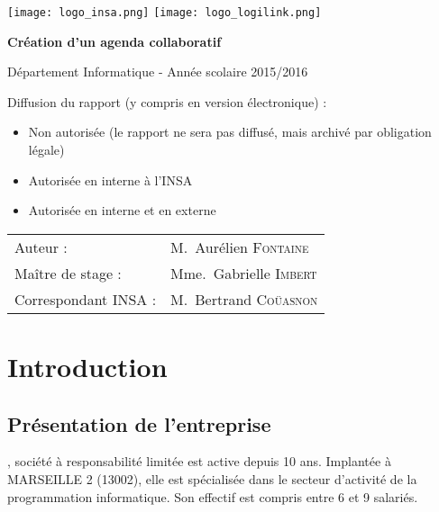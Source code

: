 \documentclass[a4paper, 11pt]{report}
\begin{document}
    \begin{titlepage}
        \texttt{[image: logo\_insa.png]}
        \hspace{0.35\textwidth}
        \texttt{[image: logo\_logilink.png]}
        \begin{center}
	        \vspace{7cm}
	        {\huge\bfseries Création d'un agenda collaboratif \par}
	        \vspace{0.5cm}
	        {\Large Département Informatique - Année scolaire 2015/2016\par}
        \end{center}
        \vfill

		Diffusion du rapport (y compris en version électronique) :

		\begin{itemize}
		\item Non autorisée (le rapport ne sera pas diffusé, mais archivé par obligation légale)
		\item Autorisée en interne à l’INSA
 		\item Autorisée en interne et en externe
 		\end{itemize}

		\vspace{0.5cm}

    	\begin{tabular}{ll}
	    	{\Large Auteur :}             & M.~Aurélien \textsc{Fontaine}\\
	        {\Large Maître de stage :}    & Mme.~Gabrielle \textsc{Imbert}\\
	        {\Large Correspondant INSA :} & M.~Bertrand \textsc{Coüasnon}\\
    	\end{tabular}
    \end{titlepage}

\tableofcontents

\part{Introduction}
\chapter{Présentation de l'entreprise}
\logilink, société à responsabilité limitée est active depuis 10 ans.
Implantée à MARSEILLE 2 (13002), elle est spécialisée dans le secteur d'activité de la programmation informatique. Son effectif est compris entre 6 et 9 salariés.
\end{document}
